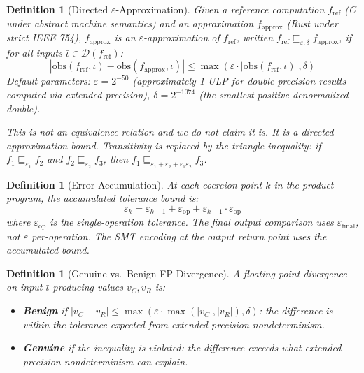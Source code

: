 \documentclass[11pt]{article}
\newtheorem{definition}[theorem]{Definition}
\newcommand{\obs}{\mathrm{obs}}
\begin{document}
\begin{definition}[Directed $\varepsilon$-Approximation]
\label{def:eps-approx}
Given a reference computation $f_{\mathrm{ref}}$ (C under abstract machine semantics) and an approximation $f_{\mathrm{approx}}$ (Rust under strict IEEE 754), $f_{\mathrm{approx}}$ is an $\varepsilon$-approximation of $f_{\mathrm{ref}}$, written $f_{\mathrm{ref}} \sqsubseteq_{\varepsilon,\delta} f_{\mathrm{approx}}$, if for all inputs $\bar{\iota} \in \mathcal{D}(f_{\mathrm{ref}})$:
\[
|\obs(f_{\mathrm{ref}}, \bar{\iota}) - \obs(f_{\mathrm{approx}}, \bar{\iota})| \leq \max(\varepsilon \cdot |\obs(f_{\mathrm{ref}}, \bar{\iota})|, \delta)
\]
Default parameters: $\varepsilon = 2^{-50}$ (approximately 1 ULP for double-precision results computed via extended precision), $\delta = 2^{-1074}$ (the smallest positive denormalized double).

This is \emph{not} an equivalence relation and we do not claim it is. It is a directed approximation bound. Transitivity is replaced by the triangle inequality: if $f_1 \sqsubseteq_{\varepsilon_1} f_2$ and $f_2 \sqsubseteq_{\varepsilon_2} f_3$, then $f_1 \sqsubseteq_{\varepsilon_1 + \varepsilon_2 + \varepsilon_1\varepsilon_2} f_3$.
\end{definition}

\begin{definition}[Error Accumulation]
\label{def:error-accum}
At each coercion point $k$ in the product program, the accumulated tolerance bound is:
\[
\varepsilon_k = \varepsilon_{k-1} + \varepsilon_{\mathrm{op}} + \varepsilon_{k-1} \cdot \varepsilon_{\mathrm{op}}
\]
where $\varepsilon_{\mathrm{op}}$ is the single-operation tolerance. The final output comparison uses $\varepsilon_{\mathrm{final}}$, not $\varepsilon$ per-operation. The SMT encoding at the output return point uses the accumulated bound.
\end{definition}

\begin{definition}[Genuine vs.\ Benign FP Divergence]
\label{def:fp-divergence-class}
A floating-point divergence on input $\bar{\iota}$ producing values $v_C, v_R$ is:
\begin{itemize}
  \item \textbf{Benign} if $|v_C - v_R| \leq \max(\varepsilon \cdot \max(|v_C|, |v_R|), \delta)$: the difference is within the tolerance expected from extended-precision nondeterminism.
  \item \textbf{Genuine} if the inequality is violated: the difference exceeds what extended-precision nondeterminism can explain.
\end{itemize}
\end{definition}
\end{document}
